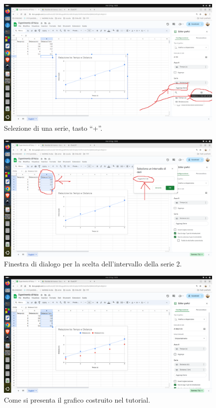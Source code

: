 \documentclass[12pt,a4paper,oneside]{book}
\theoremstyle{esercizio}
\begin{document}
\begin{enumerate}
      \begin{figure}[h!]
    \centering
    \includegraphics[width=\linewidth]{img/intervallo2.png} 
    \caption{Selezione di una serie, tasto ``+''.}
    \label{fig:intervallo2}
 \end{figure} 
    
    
\begin{figure}[h!]
    \centering
    \includegraphics[width=\linewidth]{img/intervallo2-dialogo.png} 
    \caption{Finestra di dialogo per la scelta dell'intervallo della serie 2.}
    \label{fig:intervallo2-dialogo}
 \end{figure} 

\begin{figure}[h!]
    \centering
    \includegraphics[width=\linewidth]{img/finale.png} 
    \caption{Come si presenta il grafico costruito nel tutorial.}
    \label{fig:finale}
 \end{figure} 
\end{enumerate}
\end{document}

